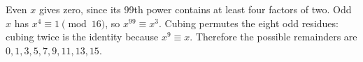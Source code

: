 Even $x$ gives zero, since its 99th power contains at least four factors of two. Odd $x$ has $x^4\equiv1\pmod{16}$, so $x^{99}\equiv x^3$. Cubing permutes the eight odd residues: cubing twice is the identity because $x^9\equiv x$. Therefore the possible remainders are $\boxed{0,1,3,5,7,9,11,13,15}$.
